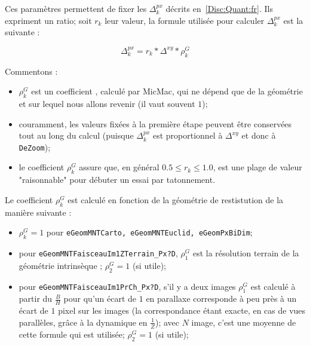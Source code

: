 Ces param\`etres  permettent de fixer les $\Delta^{px}_k$
d\'ecrits en~\ref{Disc:Quant:fr}. Ils expriment un ratio;
soit $r_k$ leur valeur, la formule utilis\'ee pour calculer
$\Delta^{px}_k$ est la suivante :


\begin{equation}
   \Delta^{px}_k = r_k * \Delta^{xy} * \rho^G_k
\end{equation}


Commentons :

\begin{itemize}
   \item $\rho^G_k$ est un coefficient , calcul\'e par MicMac,
         qui ne d\'epend que de la g\'eom\'etrie et
         sur lequel nous allons revenir (il vaut souvent $1$);

   \item  couramment, les valeurs fix\'ees \`a la premi\`ere \'etape
          peuvent \^etre conserv\'ees tout au long du calcul
          (puisque $\Delta^{px}_k$ est proportionnel \`a $\Delta^{xy}$
           et donc \`a {\tt DeZoom});

   \item le coefficient $\rho^G_k$ assure que, en g\'en\'eral $0.5 \leq r_k \leq 1.0$,
         est une plage de valeur "raisonnable" pour d\'ebuter un essai par
         tatonnement.
\end{itemize}

Le coefficient $\rho^G_k$ est calcul\'e
en fonction de la g\'eom\'etrie de restistution
de la mani\`ere suivante :



\begin{itemize}
   \item  $\rho^G_k=1$  pour {\tt eGeomMNTCarto, eGeomMNTEuclid, eGeomPxBiDim};

   \item  pour {\tt eGeomMNTFaisceauIm1ZTerrain\_Px?D}, $\rho^G_1$ est la r\'esolution
          terrain  de la g\'eom\'etrie intrins\`eque ; $\rho^G_2=1$ (si utile);

   \item  pour {\tt eGeomMNTFaisceauIm1PrCh\_Px?D}, s'il y a deux images $\rho^G_1$
          est calcul\'e \`a partir du $\frac{B}{H}$ pour qu'un
          \'ecart de $1$ en parallaxe corresponde \`a peu pr\`es \`a un \'ecart de
           $1$ pixel sur les images (la correspondance \'etant exacte, en cas de vues
           parall\`eles, gr\^ace \`a la dynamique en $\frac{1}{Z}$);
           avec $N$ image, c'est une moyenne de cette formule qui est utilis\'ee;
           $\rho^G_2=1$ (si utile);

\end{itemize}


